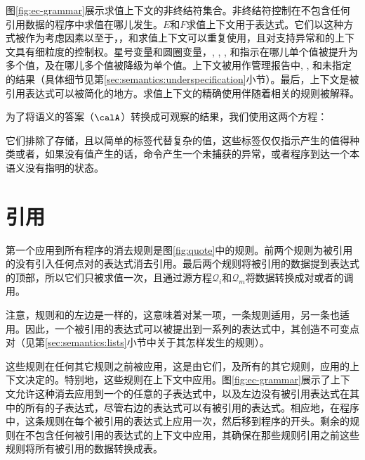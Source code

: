 \beginfig
\begin{center}

\end{center}
\caption{多个值和call-with-values}\label{fig:Multiple--values--and--call-with-values}
\endfig

图\ref{fig:ec-grammar}展示求值上下文的非终结符集合。非终结符控制在不包含任何引用数据的程序中求值在哪儿发生。$E$和$F$求值上下文用于表达式。它们以这种方式被作为考虑因素以至于，，和求值上下文可以重复使用，且对支持异常和的上下文具有细粒度的控制权。星号变量和圆圈变量，\Estar{}, \Eo{}, \Fstar{}, 和\Fo{}指示在哪儿单个值被提升为多个值，及在哪儿多个值被降级为单个值。上下文被用作管理报告中, , 和未指定的结果（具体细节见第\ref{sec:semantics:underspecification}小节）。最后，上下文是被引用表达式可以被简化的地方。求值上下文的精确使用伴随着相关的规则被解释。

为了将语义的答案（$\calA$）转换成可观察的结果，我们使用这两个方程：


它们排除了存储，且以简单的标签代替复杂的值，这些标签仅仅指示产生的值得种类或者，如果没有值产生的话，命令产生一个未捕获的异常，或者程序到达一个本语义没有指明的状态。

\section{引用}\label{sec:semantics:quote}

第一个应用到所有程序的消去规则是图\ref{fig:quote}中的规则。前两个规则为被引用的没有引入任何点对的表达式消去引用。最后两个规则将被引用的数据提到表达式的顶部，所以它们只被求值一次，且通过源方程$\mathscr{Q}_i$和$\mathscr{Q}_m$将数据转换成对或者的调用。

注意，规则和的左边是一样的，这意味着对某一项，一条规则适用，另一条也适用。因此，一个被引用的表达式可以被提出到一系列的表达式中，其创造不可变点对（见第\ref{sec:semantics:lists}小节中关于其怎样发生的规则）。

这些规则在任何其它规则之前被应用，这是由它们，及所有的其它规则，应用的上下文决定的。特别地，这些规则在上下文中应用。图\ref{fig:ec-grammar}展示了上下文允许这种消去应用到一个的任意的子表达式中，以及左边没有被引用表达式在其中的所有的子表达式，尽管右边的表达式可以有被引用的表达式。相应地，在程序中，这条规则在每个被引用的表达式上应用一次，然后移到程序的开头。剩余的规则在不包含任何被引用的表达式的上下文中应用，其确保在那些规则引用之前这些规则将所有被引用的数据转换成表。

